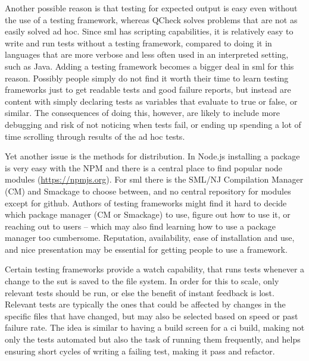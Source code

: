 \documentclass[11pt]{article}
\begin{document}
Another possible reason is that testing for expected output is easy even without the use of a testing framework, whereas QCheck solves problems that are not as easily solved ad hoc. Since \gls{sml} has scripting capabilities, it is relatively easy to write and run tests without a testing framework, compared to doing it in languages that are more verbose and less often used in an interpreted setting, such as Java. Adding a testing framework becomes a bigger deal in \gls{sml} for this reason. Possibly people simply do not find it worth their time to learn testing frameworks just to get readable tests and good failure reports, but instead are content with simply declaring tests as variables that evaluate to true or false, or similar. The consequences of doing this, however, are likely to include more debugging and risk of not noticing when tests fail, or ending up spending a lot of time scrolling through results of the ad hoc tests.

Yet another issue is the methods for distribution. In Node.js installing a package is very easy with the NPM and there is a central place to find popular node modules (\url{https://npmjs.org}). For \gls{sml} there is the SML/NJ Compilation Manager (CM) and Smackage to choose between, and no central repository for modules except for github. Authors of testing frameworks might find it hard to decide which package manager (CM or Smackage) to use, figure out how to use it, or reaching out to users -- which may also find learning how to use a package manager too cumbersome. Reputation, availability, ease of installation and use, and nice presentation may be essential for getting people to use a framework. %

Certain testing frameworks provide a watch capability, that runs tests whenever a change to the \gls{sut} is saved to the file system. In order for this to scale, only relevant tests should be run, or else the benefit of instant feedback is lost. Relevant tests are typically the ones that could be affected by changes in the specific files that have changed, but may also be selected based on speed or past failure rate. The idea is similar to having a build screen for a \gls{ci} build, making not only the tests automated but also the task of running them frequently, and helps ensuring short cycles of writing a failing test, making it pass and refactor.
\end{document}
